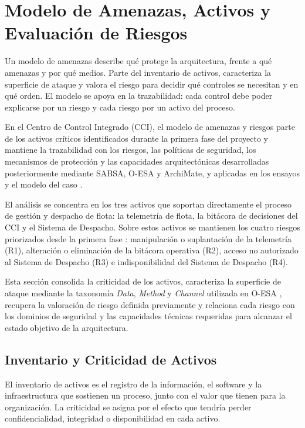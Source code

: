 \section{Modelo de Amenazas, Activos y Evaluación de Riesgos}

Un modelo de amenazas describe qué protege la arquitectura, frente a qué amenazas y por qué medios. Parte del inventario de activos, caracteriza la superficie de ataque y valora el riesgo para decidir qué controles se necesitan y en qué orden. El modelo se apoya en la trazabilidad: cada control debe poder explicarse por un riesgo y cada riesgo por un activo del proceso.

En el Centro de Control Integrado (CCI), el modelo de amenazas y riesgos parte de los activos
críticos identificados durante la primera fase del proyecto \parencite{fase1cci2026} y mantiene la trazabilidad con los
riesgos, las políticas de seguridad, los mecanismos de protección y las capacidades arquitectónicas
desarrolladas posteriormente mediante SABSA, O-ESA y ArchiMate, y aplicadas en los ensayos y el modelo del caso \parencite{sabsaCCI2026,oesaCCI2026,modeloArchimateCCI2026}.

El análisis se concentra en los tres activos que soportan directamente el proceso de gestión y
despacho de flota: la telemetría de flota, la bitácora de decisiones del CCI y el Sistema de
Despacho. Sobre estos activos se mantienen los cuatro riesgos priorizados desde la primera fase \parencite{fase1cci2026}:
manipulación o suplantación de la telemetría (R1), alteración o eliminación de la bitácora
operativa (R2), acceso no autorizado al Sistema de Despacho (R3) e indisponibilidad del
Sistema de Despacho (R4).

Esta sección consolida la criticidad de los activos, caracteriza la superficie de ataque
mediante la taxonomía \textit{Data}, \textit{Method} y \textit{Channel} utilizada en O-ESA \parencite{oesa2011}, recupera la
valoración de riesgo definida previamente y relaciona cada riesgo con los dominios de seguridad
y las capacidades técnicas requeridas para alcanzar el estado objetivo de la arquitectura.


\subsection{Inventario y Criticidad de Activos}

El inventario de activos es el registro de la información, el software y la infraestructura que sostienen un proceso, junto con el valor que tienen para la organización. La criticidad se asigna por el efecto que tendría perder confidencialidad, integridad o disponibilidad en cada activo.

